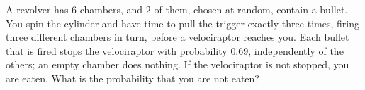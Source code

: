A revolver has $6$ chambers, and $2$ of them, chosen at random, contain a bullet. You spin the cylinder and have time to pull the trigger exactly three times, firing three different chambers in turn, before a velociraptor reaches you. Each bullet that is fired stops the velociraptor with probability $0.69$, independently of the others; an empty chamber does nothing. If the velociraptor is not stopped, you are eaten. What is the probability that you are not eaten?
